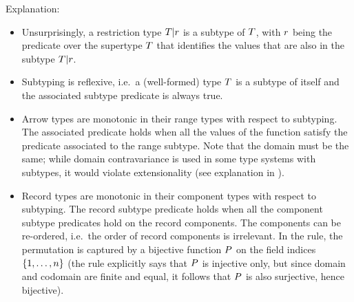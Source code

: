 


Explanation:
\begin{itemize}
\item
Unsurprisingly, a restriction type $T|r$ is a subtype of $T$, with
$r$ being the predicate over the supertype $T$ that identifies the
values that are also in the subtype $T|r$.
\item
Subtyping is reflexive, i.e.\ a (well-formed) type $T$ is a subtype of
itself and the associated subtype predicate is always true.
\item
Arrow types are monotonic in their range types with respect to subtyping. The
associated predicate holds when all the values of the function satisfy the
predicate associated to the range subtype. Note that the domain must be the
same; while domain contravariance is used in some type systems with subtypes,
it would violate extensionality (see explanation in \cite{pvs-seman}).
\item
Record types are monotonic in their component types with respect to
subtyping. The record subtype predicate holds when all the component subtype
predicates hold on the record components. The components can be re-ordered,
i.e.\ the order of record components is irrelevant. In the rule, the
permutation is captured by a bijective function $P$ on the field indices
$\{1,\ldots,n\}$ (the rule explicitly says that $P$ is injective only, but
since domain and codomain are finite and equal, it follows that $P$ is
also surjective, hence bijective).
\end{itemize}

